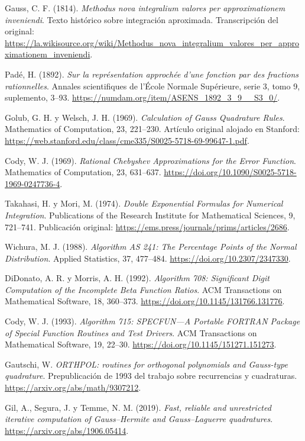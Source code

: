 \documentclass[11pt,a4paper]{article}
\theoremstyle{definition}
\begin{document}
\begin{enumerate}[label={[\arabic*]},itemsep=5pt]
\item Gauss, C. F. (1814). \textit{Methodus nova integralium valores per approximationem inveniendi}. Texto histórico sobre integración aproximada. Transcripción del original: \url{https://la.wikisource.org/wiki/Methodus_nova_integralium_valores_per_approximationem_inveniendi}.
\item Padé, H. (1892). \textit{Sur la représentation approchée d'une fonction par des fractions rationnelles}. Annales scientifiques de l'École Normale Supérieure, serie 3, tomo 9, suplemento, 3--93. \url{https://numdam.org/item/ASENS_1892_3_9__S3_0/}.
\item Golub, G. H. y Welsch, J. H. (1969). \textit{Calculation of Gauss Quadrature Rules}. Mathematics of Computation, 23, 221--230. Artículo original alojado en Stanford: \url{https://web.stanford.edu/class/cme335/S0025-5718-69-99647-1.pdf}.
\item Cody, W. J. (1969). \textit{Rational Chebyshev Approximations for the Error Function}. Mathematics of Computation, 23, 631--637. \url{https://doi.org/10.1090/S0025-5718-1969-0247736-4}.
\item Takahasi, H. y Mori, M. (1974). \textit{Double Exponential Formulas for Numerical Integration}. Publications of the Research Institute for Mathematical Sciences, 9, 721--741. Publicación original: \url{https://ems.press/journals/prims/articles/2686}.
\item Wichura, M. J. (1988). \textit{Algorithm AS 241: The Percentage Points of the Normal Distribution}. Applied Statistics, 37, 477--484. \url{https://doi.org/10.2307/2347330}.
\item DiDonato, A. R. y Morris, A. H. (1992). \textit{Algorithm 708: Significant Digit Computation of the Incomplete Beta Function Ratios}. ACM Transactions on Mathematical Software, 18, 360--373. \url{https://doi.org/10.1145/131766.131776}.
\item Cody, W. J. (1993). \textit{Algorithm 715: SPECFUN---A Portable FORTRAN Package of Special Function Routines and Test Drivers}. ACM Transactions on Mathematical Software, 19, 22--30. \url{https://doi.org/10.1145/151271.151273}.
\item Gautschi, W. \textit{ORTHPOL: routines for orthogonal polynomials and Gauss-type quadrature}. Prepublicación de 1993 del trabajo sobre recurrencias y cuadraturas. \url{https://arxiv.org/abs/math/9307212}.
\item Gil, A., Segura, J. y Temme, N. M. (2019). \textit{Fast, reliable and unrestricted iterative computation of Gauss--Hermite and Gauss--Laguerre quadratures}. \url{https://arxiv.org/abs/1906.05414}.

\end{enumerate}
\end{document}
